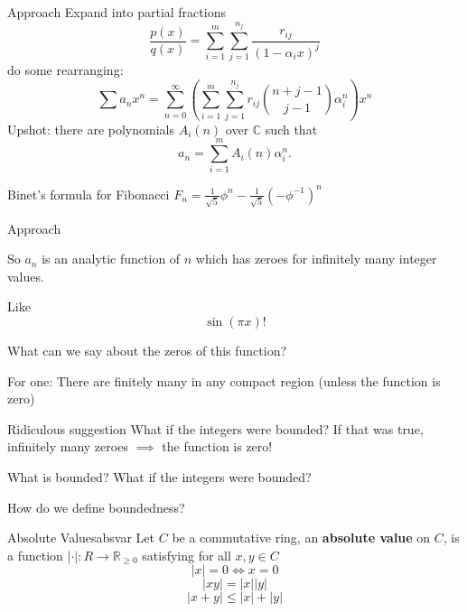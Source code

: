 \documentclass[notheorems]{beamer}
\theoremstyle{plain}
\newcommand{\terminology}[1]{\textbf{#1}}
\newcommand{\CC}{\mathbb C}
\newcommand{\RR}{\mathbb R}
\begin{document}
\begin{frame}{Approach}
    Expand into partial fractions%
    \begin{equation*}
        \frac{p(x)}{q(x)} = \sum_{i = 1}^m \sum_{j=1}^{n_j} \frac{r_{ij}}{(1-\alpha_i x)^j}
    \end{equation*}
    \pause
    do some rearranging:
    \begin{equation*}
        \sum a_n x^n = \sum_{n=0}^\infty \left(\sum_{i = 1}^m \sum_{j=1}^{n_j} r_{ij} \binom{n+j-1}{j-1}  \alpha_i^n\right) x^n
    \end{equation*}
    \pause
    Upshot: there are polynomials \(A_i(n)\) over $\CC$ such that%
    \begin{equation*}
        a_n = \sum_{i=1}^m A_i(n)\alpha_i^n\text{.}
    \end{equation*}
    \begin{example}{Binet's formula for Fibonacci}{}
        \(F_n = \frac{1}{\sqrt5}\phi ^n - \frac{1}{\sqrt 5}(-\phi^{-1})^{n}\)
    \end{example}
\end{frame}

\begin{frame}{Approach}

    So \(a_n\) is an analytic function of \(n\) which has zeroes for infinitely many integer values.
    \par\pause
    Like \[\sin(\pi x)!\]
    \par\pause
    What can we say about the zeros of this function?
    \par\pause
    For one: There are finitely many in any compact region (unless the function is zero)
    \par\pause
    \begin{alertblock}{Ridiculous suggestion}
        What if the integers were bounded? If that was true, infinitely many zeroes \(\implies\) the function is zero!
    \end{alertblock}
\end{frame}

\begin{frame}{What is bounded?}
    What if the integers were bounded?

    How do we define boundedness?

    \begin{definition}{Absolute Values}{absvar}
        Let $C$ be a commutative ring,
        an \terminology{absolute value} on $C$, is a function
        \(|\cdot | \colon R \to \RR_{\ge 0}\)
        satisfying for all $x,y \in C$
        \[|x| = 0 \iff x = 0\]
        \[|xy| = |x ||y|\]
        \[|x+y| \le |x | + |y|\]
    \end{definition}
\end{frame}
\end{document}
